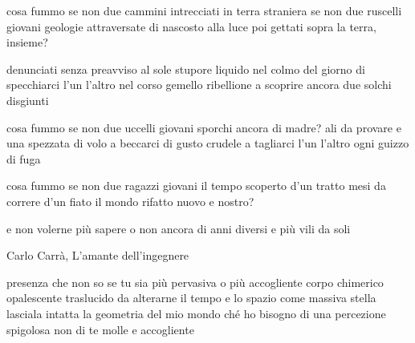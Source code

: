 \begin{poem}
	\begin{stanza}
		cosa fummo\verseline
		se non due cammini\verseline
		intrecciati in terra straniera\verseline
		se non due ruscelli giovani\verseline
		geologie attraversate di nascosto alla luce\verseline
		poi gettati sopra la terra, insieme?
	\end{stanza}

	\begin{stanza}
		denunciati senza preavviso al sole\verseline
		stupore liquido nel colmo del giorno\verseline
		di specchiarci l'un l'altro\verseline
		nel corso gemello\verseline
		ribellione a scoprire\verseline
		ancora due solchi disgiunti
	\end{stanza}

	\begin{stanza}
		cosa fummo\verseline
		se non due uccelli giovani\verseline
		sporchi ancora di madre?\verseline
		ali da provare e una spezzata di volo\verseline
		a beccarci di gusto crudele\verseline
		a tagliarci l'un l'altro ogni guizzo di fuga
	\end{stanza}

	\begin{stanza}
		cosa fummo\verseline
		se non due ragazzi giovani\verseline
		il tempo scoperto d'un tratto\verseline
		mesi da correre d'un fiato\verseline
		il mondo rifatto nuovo e nostro?
	\end{stanza}
	
	\begin{stanza}
		e non volerne più sapere\verseline
		o non ancora\verseline
		di anni diversi e più vili\verseline
		da soli
	\end{stanza}
\end{poem}

\clearpage


\begin{artItem}
	Carlo Carrà, L’amante dell’ingegnere
\end{artItem}

\begin{poem}
	\begin{stanza}
		presenza che non so\verseline
		se tu sia più pervasiva o più accogliente\verseline
		corpo chimerico opalescente traslucido\verseline
		da alterarne il tempo e lo spazio\verseline
		come massiva stella\verseline
		lasciala intatta la geometria del mio mondo\verseline
		ché ho bisogno di una percezione spigolosa\verseline
		non di te molle e accogliente
	\end{stanza}
\end{poem}

